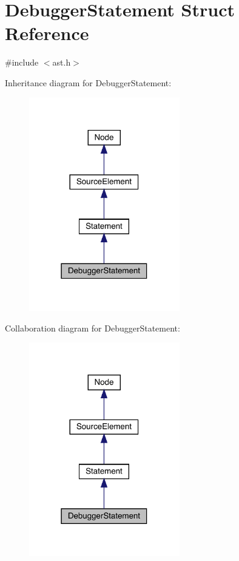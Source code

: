 \hypertarget{struct_debugger_statement}{}\section{Debugger\+Statement Struct Reference}
\label{struct_debugger_statement}


{\ttfamily \#include $<$ast.\+h$>$}



Inheritance diagram for Debugger\+Statement\+:
\nopagebreak
\begin{figure}[H]
\begin{center}
\leavevmode
\includegraphics[width=186pt]{struct_debugger_statement__inherit__graph}
\end{center}
\end{figure}


Collaboration diagram for Debugger\+Statement\+:
\nopagebreak
\begin{figure}[H]
\begin{center}
\leavevmode
\includegraphics[width=186pt]{struct_debugger_statement__coll__graph}
\end{center}
\end{figure}
